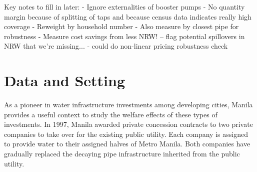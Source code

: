 \documentclass[12pt,table]{article}
\begin{document}
Key notes to fill in later:
- Ignore externalities of booster pumps
- No quantity margin because of splitting of taps and because census data indicates really high coverage
- Reweight by household number
- Also measure by closest pipe for robustness
- Measure cost savings from less NRW! 
	-- flag potential spillovers in NRW that we're missing...
- could do non-linear pricing robustness check







\section{Data and Setting}

As a pioneer in water infrastructure investments among developing cities, Manila provides a useful context to study the welfare effects of these types of investments.  In 1997, Manila awarded private concession contracts to two private companies to take over for the existing public utility.  Each company is assigned to provide water to their assigned halves of Metro Manila.  Both companies have gradually replaced the decaying pipe infrastructure inherited from the public utility.  
\end{document}
